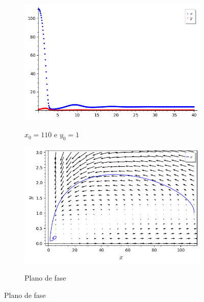 \begin{figure}[H]
    \centering
    \begin{subfigure}{0.4\textwidth}
        \includegraphics[scale=0.48]{figuras/HT_13.png}
        \label{fig:HT_13}
        \caption{$x_0 = 110$ e $y_0 = 1$}
    \end{subfigure}
    \begin{subfigure}{0.4\textwidth}
        \includegraphics[scale=0.48]{figuras/HT_14.png}
        \label{fig:HT_14}
        \caption{Plano de fase}
    \end{subfigure}
\end{figure}

